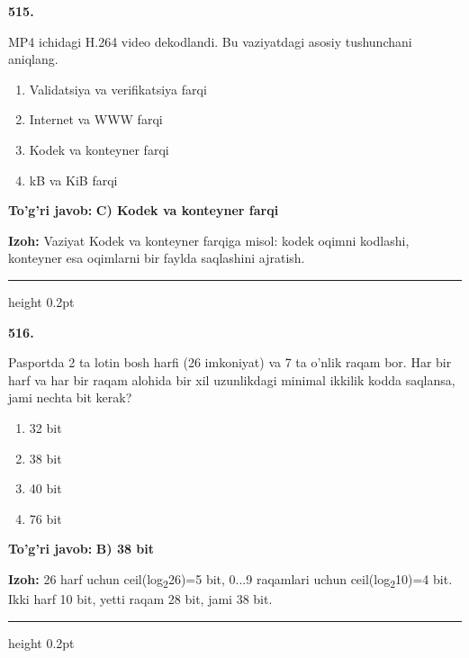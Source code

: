 \documentclass[10pt,a4paper,oneside]{article}
\begin{document}
\noindent\textbf{\color{ink}515.}
\par
MP4 ichidagi H.264 video dekodlandi. Bu vaziyatdagi asosiy tushunchani aniqlang.
\begin{enumerate}[label=\Alph*),leftmargin=9mm]
\item Validatsiya va verifikatsiya farqi
\item Internet va WWW farqi
\item Kodek va konteyner farqi
\item kB va KiB farqi
\end{enumerate}
\begin{tcolorbox}[enhanced,breakable,colback=teal!4,colframe=teal!50!black,boxrule=0.5pt,arc=1.1mm,left=3mm,right=3mm,top=1.7mm,bottom=1.7mm,before skip=2mm,after skip=2mm]
\textbf{\color{teal}To'g'ri javob:} \textbf{C) Kodek va konteyner farqi}
\par\smallskip
\textbf{Izoh:} Vaziyat Kodek va konteyner farqiga misol: kodek oqimni kodlashi, konteyner esa oqimlarni bir faylda saqlashini ajratish.
\end{tcolorbox}
\vspace{2mm}\hrule height 0.2pt \vspace{3mm}

\noindent\textbf{\color{ink}516.}
\par
Pasportda 2 ta lotin bosh harfi (26 imkoniyat) va 7 ta o'nlik raqam bor. Har bir harf va har bir raqam alohida bir xil uzunlikdagi minimal ikkilik kodda saqlansa, jami nechta bit kerak?
\begin{enumerate}[label=\Alph*),leftmargin=9mm]
\item 32 bit
\item 38 bit
\item 40 bit
\item 76 bit
\end{enumerate}
\begin{tcolorbox}[enhanced,breakable,colback=teal!4,colframe=teal!50!black,boxrule=0.5pt,arc=1.1mm,left=3mm,right=3mm,top=1.7mm,bottom=1.7mm,before skip=2mm,after skip=2mm]
\textbf{\color{teal}To'g'ri javob:} \textbf{B) 38 bit}
\par\smallskip
\textbf{Izoh:} 26 harf uchun ceil(log\textsubscript{2}26)=5 bit, 0...9 raqamlari uchun ceil(log\textsubscript{2}10)=4 bit. Ikki harf 10 bit, yetti raqam 28 bit, jami 38 bit.
\end{tcolorbox}
\vspace{2mm}\hrule height 0.2pt \vspace{3mm}
\end{document}
